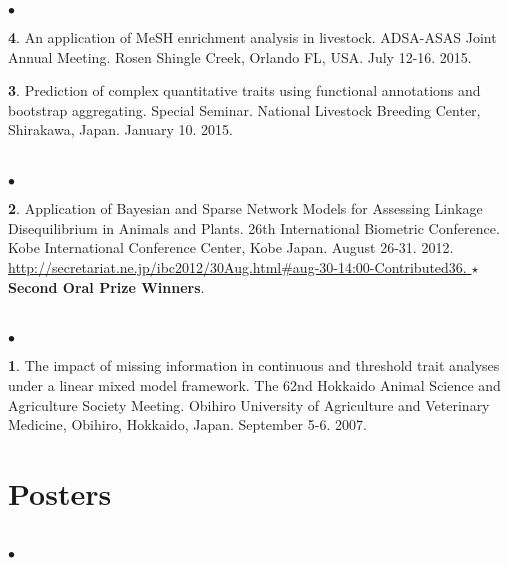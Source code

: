 \documentclass[margin,line,10pt]{res}
\newenvironment{list2}{
  \begin{list}{$\bullet$}{%
      \setlength{\itemsep}{0in}
      \setlength{\parsep}{0in} \setlength{\parskip}{0in}
      \setlength{\topsep}{0in} \setlength{\partopsep}{0in} 
      \setlength{\leftmargin}{0.2in}}}{\end{list}}
\begin{document}
\begin{resume}
\begin{list2}
  \vspace{0.5cm}

\item [{\bf 4}.] An application of MeSH enrichment analysis in livestock. ADSA-ASAS Joint Annual Meeting. Rosen Shingle Creek, Orlando FL, USA. July 12-16. 2015.

  \vspace{0.5cm}
  
\item [{\bf 3}.] Prediction of complex quantitative traits using functional annotations and bootstrap aggregating. Special Seminar. National Livestock Breeding Center, Shirakawa, Japan. January 10. 2015.
\end{list2}  

\section{}
\begin{list2}
\item  [{\bf 2}.] Application of Bayesian and Sparse Network Models for Assessing Linkage Disequilibrium in Animals and Plants. 26th International Biometric Conference. Kobe International Conference Center, Kobe Japan. August 26-31. 2012. 
  \textcolor{blue}{\href{http://secretariat.ne.jp/ibc2012/30Aug.html\#aug-30-14:00-Contributed36}{http://secretariat.ne.jp/ibc2012/30Aug.html\#aug-30-14:00-Contributed36. } }   {\bf $\star$Second Oral Prize Winners}.
\end{list2}


\section{}
\begin{list2}
\item  [{\bf 1}.] The impact of missing information in continuous and threshold trait analyses under a linear mixed model framework. The 62nd Hokkaido Animal Science and Agriculture Society Meeting. Obihiro University of Agriculture and Veterinary Medicine, Obihiro, Hokkaido, Japan. September 5-6. 2007.
\end{list2}


\vspace{0.5cm}
\section{ \sc Posters }
\vspace{0.5cm}
\section{}
\begin{list2}


\end{list2}
\end{resume}
\end{document}
